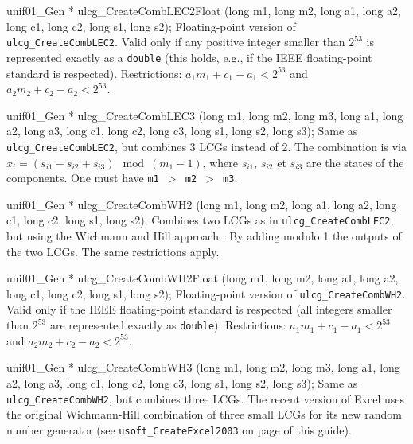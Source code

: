 unif01_Gen * ulcg_CreateCombLEC2Float (long m1, long m2, long a1, long a2,
                                       long c1, long c2, long s1, long s2);
\endcode
  \tab  Floating-point version of {\tt ulcg\_CreateCombLEC2}.
   Valid only if any positive integer smaller than
   $2^{53}$ is represented exactly as a {\tt double}
   (this holds, e.g., if the IEEE  floating-point standard is respected).
   Restrictions:  $a_1m_1+c_1 - a_1 < 2^{53}$ and $a_2m_2+c_2 - a_2< 2^{53}$.
  \endtab
\code


unif01_Gen * ulcg_CreateCombLEC3 (long m1, long m2, long m3, long a1,
                                  long a2, long a3, long c1, long c2,
                                  long c3, long s1, long s2, long s3);
\endcode
  \tab  Same as {\tt ulcg\_CreateCombLEC2}, but combines 3 LCGs instead of 2.
   The combination is via
    $x_i = (s_{i1} - s_{i2} + s_{i3}) \mod (m_1-1)$,
   where $s_{i1}$, $s_{i2}$ et $s_{i3}$
   are the states of the components.
   One must have {\tt m1 $>$ m2 $>$ m3}.
  \endtab
\code


unif01_Gen * ulcg_CreateCombWH2 (long m1, long m2, long a1, long a2,
                                 long c1, long c2, long s1, long s2);
\endcode
  \tab  Combines two LCGs as in {\tt ulcg\_CreateCombLEC2}, but using the
   Wichmann and Hill approach \cite {rWIC82a}:
 \label{gen:Wichmann-Hill}%
   By adding modulo 1 the outputs of the two LCGs.
   The same restrictions apply.
  \endtab
\code


unif01_Gen * ulcg_CreateCombWH2Float (long m1, long m2, long a1, long a2,
                                      long c1, long c2, long s1, long s2);
\endcode
  \tab  Floating-point version of {\tt ulcg\_CreateCombWH2}. Valid only if the
   IEEE  floating-point standard is respected (all integers smaller than
   $ 2^{53}$ are represented exactly as {\tt double}).
   Restrictions:  $a_1m_1+c_1 - a_1 < 2^{53}$ and $a_2m_2+c_2 - a_2< 2^{53}$.
  \endtab
\code


unif01_Gen * ulcg_CreateCombWH3 (long m1, long m2, long m3, long a1,
                                 long a2, long a3, long c1, long c2,
                                 long c3, long s1, long s2, long s3);
\endcode
  \tab  Same as {\tt ulcg\_CreateCombWH2}, but combines three LCGs.
   The recent version of Excel uses the original Wichmann-Hill combination
   of three small LCGs \cite {rWIC82a} for its new random number
   generator (see \texttt{usoft\_CreateExcel2003}
   on page \pageref{gen:Excel2003} of this guide).
  \endtab


